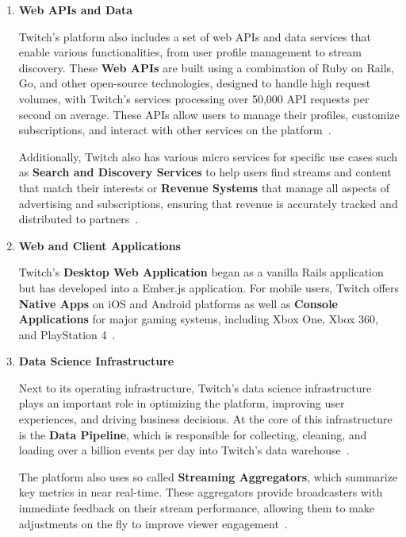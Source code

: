\begin{enumerate}
    \item \textbf{Web \ac{API}s and Data}

    Twitch’s platform also includes a set of web \ac{API}s and data services that enable various functionalities, from user profile management to stream discovery. These \textbf{Web \ac{API}s} are built using a combination of Ruby on Rails, Go, and other open-source technologies, designed to handle high request volumes, with Twitch's services processing over 50,000 \ac{API} requests per second on average. These \ac{API}s allow users to manage their profiles, customize subscriptions, and interact with other services on the platform~\parencite{twitch_engineering}.

    Additionally, Twitch also has various micro services for specific use cases such as \textbf{Search and Discovery Services} to help users find streams and content that match their interests or \textbf{Revenue Systems} that manage all aspects of advertising and subscriptions, ensuring that revenue is accurately tracked and distributed to partners~\parencite{twitch_engineering}. 
    
    \item \textbf{Web and Client Applications}
    
    Twitch’s \textbf{Desktop Web Application} began as a vanilla Rails application but has developed into a Ember.js application. For mobile users, Twitch offers \textbf{Native Apps} on iOS and Android platforms as well as \textbf{Console Applications} for major gaming systems, including Xbox One, Xbox 360, and PlayStation 4~\parencite{twitch_engineering}.

    \item \textbf{Data Science Infrastructure}

    Next to its operating infrastructure, Twitch’s data science infrastructure plays an important role in optimizing the platform, improving user experiences, and driving business decisions. At the core of this infrastructure is the \textbf{Data Pipeline}, which is responsible for collecting, cleaning, and loading over a billion events per day into Twitch’s data warehouse~\parencite{twitch_engineering}. 

    The platform also uses so called \textbf{Streaming Aggregators}, which summarize key metrics in near real-time. These aggregators provide broadcasters with immediate feedback on their stream performance, allowing them to make adjustments on the fly to improve viewer engagement~\parencite{twitch_engineering}.


\end{enumerate}
